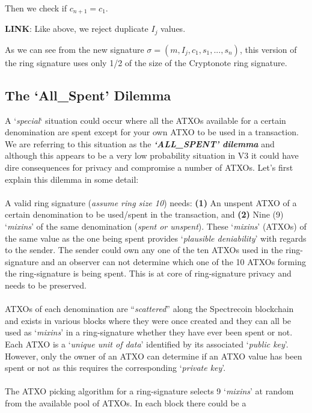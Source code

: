 Then we check if $c_{n+1}=c_1$.

\hfill \break\textbf{LINK}: 
Like above, we reject duplicate $I_j$ values.


\hfill \break As we can see from the new signature $\sigma = 
(m,I_j,c_1,s_1,...,s_n)$, this version of the ring signature 
uses only 1/2 of the size of the Cryptonote ring signature.
\newpage

\subsection{The ‘All\_Spent’ Dilemma}
A ‘\textit{special}‘ situation could occur where all the ATXOs available for a
certain denomination are spent except for your own ATXO to be used in a transaction.
We are referring to this situation as the \textbf{\textit{‘ALL\_SPENT’ dilemma}}
and although this appears to be a very low probability situation in V3 it could
have dire consequences for privacy and compromise a number of ATXOs. Let’s first
explain this dilemma in some detail:
\\
\\
\noindent
A valid ring signature (\textit{assume ring size 10}) needs: \textbf{(1)} An
unspent ATXO of a certain denomination to be used/spent in the transaction,
and \textbf{(2)} Nine (9) ‘\textit{mixins}’ of the same denomination
(\textit{spent or unspent}). These ‘\textit{mixins}’ (ATXOs) of the same
value as the one being spent provides ‘\textit{plausible deniability}’ with
regards to the sender. The sender could own any one of the ten ATXOs used
in the ring-signature and an observer can not determine which one of the
10 ATXOs forming the ring-signature is being spent. This is at core of
ring-signature privacy and needs to be preserved.
\\
\\
\noindent
ATXOs of each denomination are “\textit{scattered}” along the Spectrecoin
blockchain and exists in various blocks where they were once created and
they can all be used as ‘\textit{mixins}’ in a ring-signature whether they
have ever been spent or not. Each ATXO is a ‘\textit{unique unit of data}’
identified by its associated ‘\textit{public key}’. However, only the
owner of an ATXO can determine if an ATXO value has been spent or not
as this requires the corresponding ‘\textit{private key}’.
\\
\\
\noindent
The ATXO picking algorithm for a ring-signature selects 9 ‘\textit{mixins}’
at random from the available pool of ATXOs. In each block there could be a
